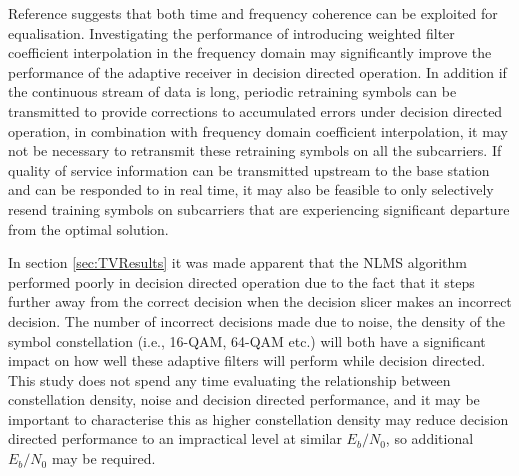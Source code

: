 Reference \cite{Wei17} suggests that both time and frequency %
coherence can be exploited for equalisation. Investigating %
the performance of introducing weighted filter coefficient %
interpolation in the frequency domain may significantly %
improve the performance of the adaptive receiver in decision %
directed operation. In addition if the continuous stream of data %
is long, periodic retraining symbols can be transmitted to %
provide corrections to accumulated errors under decision %
directed operation, in combination with frequency domain %
coefficient interpolation, it may not be necessary to %
retransmit these retraining symbols on all the subcarriers. If %
quality of service information can be transmitted upstream %
to the base station and can be responded to in real time, it %
may also be feasible to only selectively resend training %
symbols on subcarriers that are experiencing significant %
departure from the optimal solution. 

In section \ref{sec:TVResults} it was made apparent that the %
NLMS algorithm performed poorly in decision directed operation %
due to the fact that it steps further away from the correct %
decision when the decision slicer makes an incorrect decision. %
The number of incorrect decisions made due to noise, the density %
of the symbol constellation (i.e., 16-QAM, 64-QAM etc.) will both %
have a significant impact on how well these adaptive filters will %
perform while decision directed. This study does not spend any %
time evaluating the relationship between constellation density, %
noise and decision directed performance, and it may be %
important to characterise this as higher constellation density %
may reduce decision directed performance to an impractical %
level at similar $E_b/N_0$, so additional $E_b/N_0$ may be %
required.

